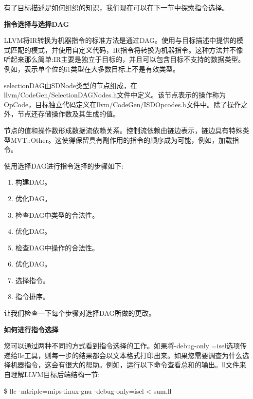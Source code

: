 有了目标描述是如何组织的知识，我们现在可以在下一节中探索指令选择。\par

\hspace*{\fill} \par %
\textbf{指令选择与选择DAG}

LLVM将IR转换为机器指令的标准方法是通过DAG。使用与目标描述中提供的模式匹配的模式，并使用自定义代码，IR指令将转换为机器指令。这种方法并不像听起来那么简单:IR主要是独立于目标的，并且可以包含目标不支持的数据类型。例如，表示单个位的i1类型在大多数目标上不是有效类型。\par

selectionDAG由SDNode类型的节点组成，在llvm/CodeGen/SelectionDAGNodes.h文件中定义。该节点表示的操作称为OpCode，目标独立代码定义在llvm/CodeGen/ISDOpcodes.h文件中。除了操作之外，节点还存储操作数及其生成的值。\par

节点的值和操作数形成数据流依赖关系。控制流依赖由链边表示，链边具有特殊类型MVT::Other。这使得保留具有副作用的指令的顺序成为可能，例如，加载指令。\par

使用选择DAG进行指令选择的步骤如下:\par

\begin{enumerate}
\item 构建DAG。
\item 优化DAG。
\item 检查DAG中类型的合法性。
\item 优化DAG。
\item 检查DAG中操作的合法性。
\item 优化DAG。
\item 选择指令。
\item 指令排序。
\end{enumerate}

让我们检查一下每个步骤对选择DAG所做的更改。\par

\hspace*{\fill} \par %
\textbf{如何进行指令选择}

您可以通过两种不同的方式看到指令选择的工作。如果将-debug-only =isel选项传递给llc工具，则每一步的结果都会以文本格式打印出来。如果您需要调查为什么选择机器指令，这会有很大的帮助。例如，运行以下命令查看总和的输出。ll文件来自理解LLVM目标后端结构一节:\par

\begin{tcolorbox}[colback=white,colframe=black]
\$ llc -mtriple=mips-linux-gnu -debug-only=isel < sum.ll
\end{tcolorbox}


